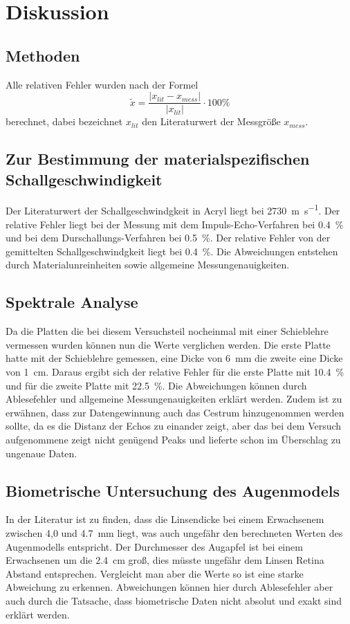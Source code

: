 \section{Diskussion}
\label{sec:Diskussion}
\subsection{Methoden}
Alle relativen Fehler wurden nach der Formel
\begin{equation*}
  \tilde{x} = \frac{ \lvert x_{lit} - x_{mess} \rvert}{\lvert x_{lit} \rvert}
  \cdot 100 \%
\end{equation*}
berechnet, dabei bezeichnet $x_{lit}$ den Literaturwert der Messgröße $x_{mess}$.
\subsection{Zur Bestimmung der materialspezifischen Schallgeschwindigkeit}
Der Literaturwert der Schallgeschwindgkeit in Acryl \cite{oly} liegt bei
\SI{2730}{\meter \per \second}. Der relative Fehler liegt bei der Messung mit
dem Impuls-Echo-Verfahren bei \SI{0.4}{\percent} und bei dem Durschallungs-Verfahren
bei \SI{0.5}{\percent}. Der relative Fehler von der gemittelten Schallgeschwindgkeit
liegt bei \SI{0.4}{\percent}. Die Abweichungen entstehen durch Materialunreinheiten
sowie allgemeine Messungenauigkeiten.
\subsection{Spektrale Analyse}
Da die Platten die bei diesem Versuchsteil nocheinmal mit einer Schieblehre
vermessen wurden können nun die Werte verglichen werden. Die erste Platte hatte
mit der Schieblehre gemessen, eine Dicke von \SI{6}{\milli\meter} die zweite
eine Dicke von \SI{1}{\centi\meter}. Daraus ergibt sich der relative Fehler für
die erste Platte mit \SI{10.4}{\percent} und für die zweite Platte mit
\SI{22.5}{\percent}. Die Abweichungen können durch Ablesefehler und allgemeine
Messungenauigkeiten erklärt werden. Zudem ist zu erwähnen, dass zur Datengewinnung
auch das Cestrum hinzugenommen werden sollte, da es die Distanz der Echos zu einander
zeigt, aber das bei dem Versuch aufgenommene zeigt nicht genügend Peaks und lieferte
schon im Überschlag zu ungenaue Daten.
\subsection{Biometrische Untersuchung des Augenmodels}
In der Literatur \cite{wiki} ist zu finden, dass die Linsendicke bei einem Erwachsenem
zwischen 4,0 und \SI{4.7}{\milli\meter} liegt, was auch ungefähr den berechneten
Werten des Augenmodells entspricht. Der Durchmesser des Augapfel ist bei
einem Erwachsenen um die \SI{2.4}{\centi\meter} groß, dies müsste ungefähr dem
Linsen Retina Abstand entsprechen. Vergleicht man aber die Werte so ist eine
starke Abweichung zu erkennen. Abweichungen können hier durch Ablesefehler aber
auch durch die Tatsache, dass biometrische Daten nicht absolut und exakt sind erklärt werden.
